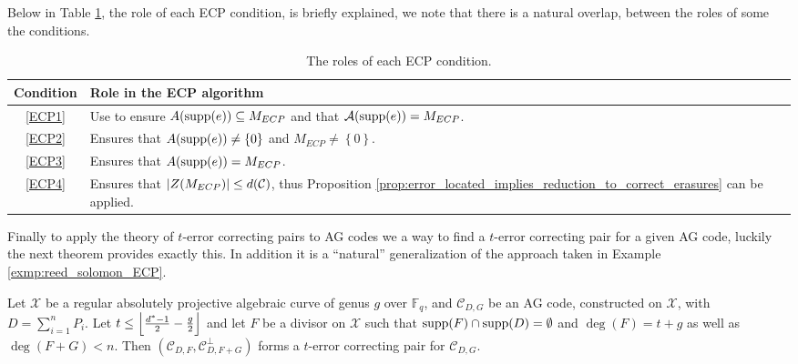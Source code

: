Below in Table \ref{tab:role_of_ecp_conditions}, the role of each ECP condition, is briefly explained, we note that there is a natural overlap, between the roles of some the conditions.
\begin{table}[H]
    \centering
    \begin{tabular} {||c|l||}
        \hline
        \textbf{Condition} & \textbf{Role in the ECP algorithm} \\
        \hline
        \ref{ECP1} & Use to ensure $A(\textnormal{supp}(e)) \subseteq M_{ECP}$ and that $\mathcal{A}(\textnormal{supp}(e)) = M_{ECP}$. \\
        \hline
        \ref{ECP2} & Ensures that $A(\textnormal{supp}(e)) \neq \left\{0\right\}$ and $M_{ECP} \neq \left\{0\right\}$.\\
        \hline
        \ref{ECP3} & Ensures that $A(\textnormal{supp}(e)) = M_{ECP}$. \\
        \hline
        \ref{ECP4} & Ensures that $\left\lvert Z(M_{ECP})\right\rvert \leq d(\mathcal{C})$, thus Proposition \ref{prop:error_located_implies_reduction_to_correct_erasures} can be applied.\\
        \hline
    \end{tabular}
    \caption{The roles of each ECP condition.}
    \label{tab:role_of_ecp_conditions}
\end{table}
Finally to apply the theory of $t$-error correcting pairs to AG codes we a way to find a $t$-error correcting pair for a given AG code, luckily the next theorem provides exactly this. In addition it is a ``natural'' generalization of the approach taken in Example \ref{exmp:reed_solomon_ECP}.
\begin{theorem}\label{thm:error_correcting_pair_for_AG_codes}
  Let $\mathcal{X}$ be a regular absolutely projective algebraic curve of genus $g$ over $\mathbb{F}_q$, and $\mathcal{C}_{D, G}$ be an AG code, constructed on $\mathcal{X}$, with $D = \sum_{i=1}^n P_i$. Let $t \leq \left\lfloor\frac{d^{*} - 1}{2} - \frac{g}{2}\right\rfloor$ and let $F$ be a divisor on $\mathcal{X}$ such that $\textnormal{supp}(F) \cap \textnormal{supp}(D) = \emptyset$ and $\deg(F) = t + g$ as well as $\deg(F + G) < n$. Then $(\mathcal{C}_{D, F}, \mathcal{C}_{D, F + G}^{\perp})$ forms a $t$-error correcting pair for $\mathcal{C}_{D,G}$.
\end{theorem}

